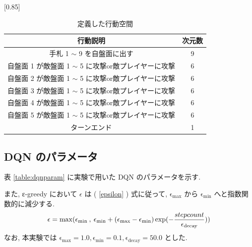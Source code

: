 \documentclass[twocolumn]{jarticle}
\begin{document}
  \begin{table}[t]
    \centering
    \caption{定義した行動空間}
    \vspace{-0.3cm}
    \label{table:action}
    \scalebox{0.80}[0.85]{
      \begin{tabular}{|c|c|}
        \hline
        行動説明                          & 次元数        \\ \hline \hline
        手札 1 $\sim$ 9 を自盤面に出す             & 9          \\ \hline
        自盤面 1 が敵盤面 1 $\sim$ 5 に攻撃or敵プレイヤーに攻撃    & 6          \\ \hline
        自盤面 2 が敵盤面 1 $\sim$ 5 に攻撃or敵プレイヤーに攻撃    & 6          \\ \hline
        自盤面 3 が敵盤面 1 $\sim$ 5 に攻撃or敵プレイヤーに攻撃    & 6          \\ \hline
        自盤面 4 が敵盤面 1 $\sim$ 5 に攻撃or敵プレイヤーに攻撃    & 6          \\ \hline
        自盤面 5 が敵盤面 1 $\sim$ 5 に攻撃or敵プレイヤーに攻撃    & 6          \\ \hline
        ターンエンド & 1 \\ \hline
        \end{tabular}
    }
    \end{table}
  
  \subsection{DQN のパラメータ}
  表 \ref{table:dqnparam} に実験で用いた DQN のパラメータを示す. \par
  また, ε-greedy において $\epsilon$ は ( \ref{epsilon} ) 式に従って, $\mathrm{\epsilon_{max}}$ から $\mathrm{\epsilon_{min}}$ へと指数関数的に減少する. 
  \begin{equation}
    \vspace{-0.3cm}
    \small
    \label{epsilon}
    \epsilon = \mathrm{max}(\mathrm{\epsilon_{min}} \: , \: \mathrm{\epsilon_{min}} + (\mathrm{\epsilon_{max} - \epsilon_{min}}) \exp(- \frac{stepcount}{\mathrm{\epsilon_{decay}}}))
  \end{equation}
  なお, 本実験では $\mathrm{\epsilon_{max}} = 1.0, \mathrm{\epsilon_{min}} = 0.1, \mathrm{\epsilon_{decay}} = 50.0$ とした.  
\end{document}
